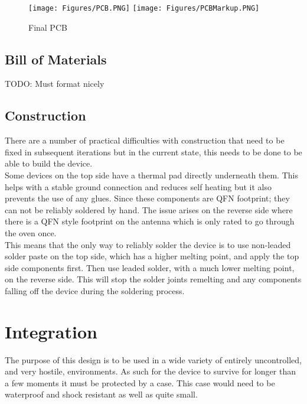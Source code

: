 \documentclass[12pt,openany,a4paper]{book}
\begin{document}
		\begin{figure}[H]
			\centering
			\texttt{[image: Figures/PCB.PNG]}
			\texttt{[image: Figures/PCBMarkup.PNG]}
			\caption{Final PCB}
			\label{fig:PCB}
		\end{figure}		
			
		\subsection{Bill of Materials}
		TODO: Must format nicely
		\subsection{Construction}
		There are a number of practical difficulties with construction that need to be fixed in subsequent iterations but in the current state, this needs to be done to be able to build the device. \\
		
		Some devices on the top side have a thermal pad directly underneath them. This helps with a stable ground connection and reduces self heating but it also prevents the use of any glues. Since these components are QFN footprint; they can not be reliably soldered by hand. The issue arises on the reverse side where there is a QFN style footprint on the antenna which is only rated to go through the oven once. \\
		
		This means that the only way to reliably solder the device is to use non-leaded solder paste on the top side, which has a higher melting point, and apply the top side components first. Then use leaded solder, with a much lower melting point, on the reverse side. This will stop the solder joints remelting and any components falling off the device during the soldering process.
		
	\section{Integration}
	The purpose of this design is to be used in a wide variety of entirely uncontrolled, and very hostile, environments. As such for the device to survive for longer than a few moments it must be protected by a case. This case would need to be waterproof and shock resistant as well as quite small. \\
	
\end{document}
